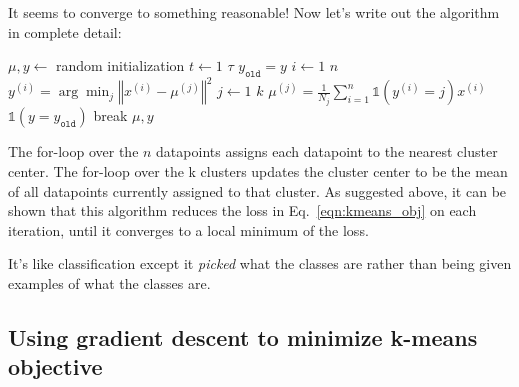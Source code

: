 It seems to converge to something reasonable! Now let's write out the
algorithm in complete detail:


\begin{codebox}
  \li $\mu, y \gets $ random initialization
  \li \For $t \gets 1$ \To $\tau$
  \li   \Do
  $y_{\texttt{old}} = y$
  \li        \For $i \gets 1$ \To $n$
  \li       \Do
  $y^{(i)} = \arg\min_j \left\Vert x^{(i)} - \mu^{(j)} \right\Vert^2$
  \End
  \li    \For $j \gets 1$ \To $k$
  \li       \Do
  $\mu^{(j)} = \frac{1}{N_j} \sum_{i=1}^n \mathbb{1}(y^{(i)} = j) x^{(i)}$
  \End
  \li      \If $\mathbb{1}(y = y_{\texttt{old}})$
  \li          \Then
  break \label{alg:termination}
  \End
  \End
  \li \Return $\mu, y$
\end{codebox}

The for-loop over the $n$ datapoints assigns each datapoint to the
nearest cluster center. The for-loop over the k clusters updates the
cluster center to be the mean of all datapoints currently assigned to
that cluster. As suggested above, it can be shown that this algorithm
reduces the loss in Eq.~\ref{eqn:kmeans_obj} on each iteration, until
it converges to a local minimum of the loss.


It's like classification except it \textit{picked} what the classes
are rather than being given examples of what the classes are.

\subsection{Using gradient descent to minimize k-means objective}

